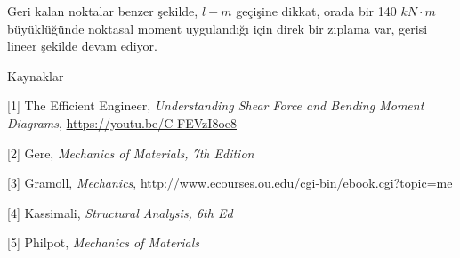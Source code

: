 \documentclass[12pt,fleqn]{article}\usepackage{../../common}
\begin{document}
Geri kalan noktalar benzer şekilde, $l-m$ geçişine dikkat, orada bir 140 $kN
\cdot m$ büyüklüğünde noktasal moment uygulandığı için direk bir zıplama var,
gerisi lineer şekilde devam ediyor.


Kaynaklar 

[1] The Efficient Engineer, {\em Understanding Shear Force and Bending Moment Diagrams},
    \url{https://youtu.be/C-FEVzI8oe8}

[2] Gere, {\em Mechanics of Materials, 7th Edition}

[3] Gramoll, {\em Mechanics},
    \url{http://www.ecourses.ou.edu/cgi-bin/ebook.cgi?topic=me}

[4] Kassimali, {\em Structural Analysis, 6th Ed}

[5] Philpot, {\em Mechanics of Materials}
    
\end{document}
